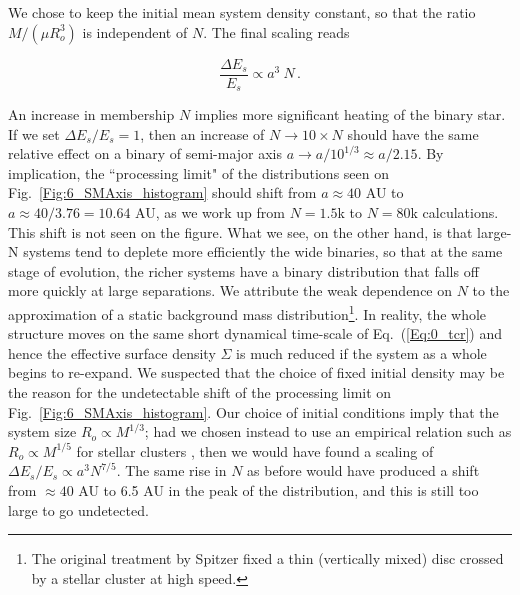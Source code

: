 We chose to keep the initial mean system density constant, so that the ratio $ M/( \mu R_o^3)$ is independent of $N$. The final scaling reads  
  
\begin{equation}
\frac{\Delta E_s}{E_s}  \propto a^3 ~ N \, .
\end{equation}

An increase in membership $N$ implies more significant heating of the binary star. If we set $\Delta E_s/E_s = 1$, then an increase of $N \rightarrow 10 \times N$ should have the same relative effect on a binary of semi-major axis $a \rightarrow a / 10^{1/3} \approx a / 2.15$. 
By implication, the ``processing limit" of the distributions seen on Fig.~\ref{Fig:6_SMAxis_histogram} should shift from 
$a \approx 40 $ AU to $ a \approx 40 / 3.76 = 10.64 $ AU, as we work up from $N = 1.5$k to $N = 80$k calculations. 
This shift is not seen on the figure. What we see, on the other hand, is that large-N systems tend to deplete more efficiently the wide binaries, so that at the same stage of evolution, the richer systems have a binary distribution that falls off more quickly at large separations. We attribute the weak dependence on $N$ to the approximation of a static background mass distribution\footnote{The original treatment by Spitzer fixed a thin (vertically mixed) disc crossed by a stellar cluster at high speed.}. In reality, the whole structure moves on the same short dynamical time-scale of Eq.~(\ref{Eq:0_tcr}) and hence the effective surface density $\Sigma$ is much reduced if the system as a whole begins to re-expand.  We suspected that the choice of fixed initial density may be the reason for the undetectable shift of the processing limit on Fig.~\ref{Fig:6_SMAxis_histogram}. Our choice of initial conditions imply that the system size $R_o \propto M^{1/3}$; had we chosen instead to use an empirical relation such as $R_o \propto M^{1/5}$ for stellar clusters \citep{Larsen2004}, then we would have found a scaling of $\Delta E_s /E_s \propto a^3 N^{7/5} $. The same rise in $N$ as before would have produced a shift from $\approx 40$ AU to 6.5 AU in the peak of the distribution, and this is still too large to go undetected. 

